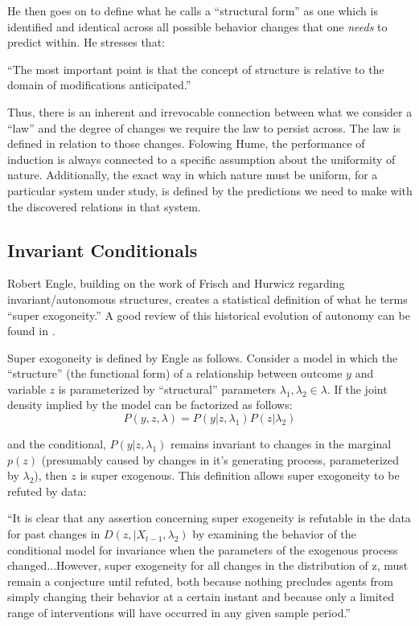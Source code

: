 \documentclass[a4paper,12pt]{article}
\begin{document}
He then goes on to define what he calls a ``structural form'' as one which is identified and identical across all possible behavior changes that one \textit{needs} to predict within. He stresses that:

\begin{displayquote}
``The most important point is that the concept of structure is relative to the domain of modifications anticipated.''
\end{displayquote}

Thus, there is an inherent and irrevocable connection between what we consider a ``law'' and the degree of changes we require the law to persist across. The law is defined in relation to those changes. Folowing Hume, the performance of induction is always connected to a specific assumption about the uniformity of nature. Additionally, the exact way in which nature must be uniform, for a particular system under study, is defined by the predictions we need to make with the discovered relations in that system.


\subsection*{Invariant Conditionals}

Robert Engle, building on the work of Frisch and Hurwicz regarding invariant/autonomous structures, creates a statistical definition of what he terms ``super exogoneity.'' A good review of this historical evolution of autonomy can be found in \cite{Aldrich1989}.

Super exogoneity is defined by Engle as follows. Consider a model in which the ``structure'' (the functional form) of a relationship between outcome $y$ and variable $z$ is parameterized by ``structural'' parameters $\lambda_1, \lambda_2 \in \lambda$. If the joint density implied by the model can be factorized as follows:
%
$$
P(y, z, \lambda) = P(y | z, \lambda_1)P(z | \lambda_2)
$$

and the conditional, $P(y | z, \lambda_1)$ remains invariant to changes in the marginal $p(z)$ (presumably caused by changes in it's generating process, parameterized by $\lambda_2$), then $z$ is super exogenous. This definition allows super exogoneity to be refuted by data:

\begin{displayquote}
``It is clear that any assertion concerning super exogeneity is refutable in the data for past changes in $D(z, | X_{t-1}, \lambda_2)$ by examining the behavior of the conditional model for invariance when the parameters of the exogenous process changed...However, super exogeneity for all changes in the distribution of z, must remain a conjecture until refuted, both because nothing precludes agents from simply changing their behavior at a certain instant and because only a limited range of interventions will have occurred in any given sample period.''
\end{displayquote}
\end{document}
